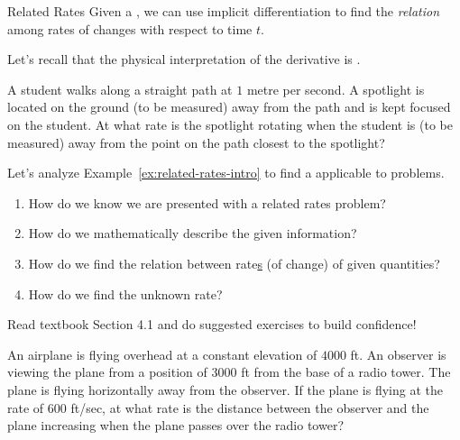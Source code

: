\documentclass[../main.tex]{subfiles}
\begin{document}
\begin{lesson}{Related Rates}
  Given a , we can use implicit differentiation  to find the \emph{relation} among rates of changes with respect to time \(t\).

  Let's recall that the physical interpretation of the derivative is .
  \begin{example} \label{ex:related-rates-intro}
    A student walks along a straight path at \(1\) metre per second.  A spotlight is located on the ground (to be measured) \underline{\hspace{1in}} away from the path and is kept focused on the student. At what rate is the spotlight rotating when the student is (to be measured) \underline{\hspace{1in}} away from the point on the path closest to the spotlight?
  \end{example}

  Let's analyze Example~\ref{ex:related-rates-intro} to find a  applicable to   problems. 
  \begin{enumerate}
    \item How do we know we are presented with a related rates problem?

    \item How do we mathematically describe the given information?

    \item How do we find the relation between rate\underline{s} (of change) of given quantities?

    \item How do we find the unknown rate?
  \end{enumerate}

  \faStar{} Read textbook Section 4.1 and do suggested exercises to build confidence!

  \clearpage
  \begin{example}
    An airplane is flying overhead at a constant elevation of \(4000\) ft. An observer is viewing the plane from a position of \(3000\) ft from the base of a radio tower. The plane is flying horizontally away from the observer. If the plane is flying at the rate of \(600\) ft/sec, at what rate is the distance between the observer and the plane increasing when the plane passes over the radio tower?


\end{example}
\end{lesson}
\end{document}
